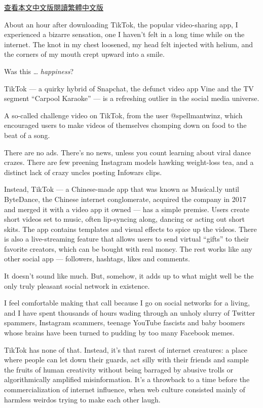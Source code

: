 \href{https://cn.nytimes.com/technology/20181204/tiktok-a-chinese-video-app-brings-fun-back-to-social-media/}{查看本文中文版}\href{https://cn.nytimes.com/technology/20181204/tiktok-a-chinese-video-app-brings-fun-back-to-social-media/zh-hant/}{閱讀繁體中文版}

About an hour after downloading TikTok, the popular video-sharing app, I
experienced a bizarre sensation, one I haven't felt in a long time while
on the internet. The knot in my chest loosened, my head felt injected
with helium, and the corners of my mouth crept upward into a smile.

Was this \ldots{} \emph{happiness}?

TikTok --- a quirky hybrid of Snapchat, the defunct video app Vine and
the TV segment ``Carpool Karaoke'' --- is a refreshing outlier in the
social media universe.

A so-called challenge video on TikTok, from the user @spellmantwinz,
which encouraged users to make videos of themselves chomping down on
food to the beat of a song.

There are no ads. There's no news, unless you count learning about viral
dance crazes. There are few preening Instagram models hawking
weight-loss tea, and a distinct lack of crazy uncles posting Infowars
clips.

Instead, TikTok --- a Chinese-made app that was known as Musical.ly
until ByteDance, the Chinese internet conglomerate, acquired the company
in 2017 and merged it with a video app it owned --- has a simple
premise. Users create short videos set to music, often lip-syncing
along, dancing or acting out short skits. The app contains templates and
visual effects to spice up the videos. There is also a live-streaming
feature that allows users to send virtual ``gifts'' to their favorite
creators, which can be bought with real money. The rest works like any
other social app --- followers, hashtags, likes and comments.

It doesn't sound like much. But, somehow, it adds up to what might well
be the only truly pleasant social network in existence.

I feel comfortable making that call because I go on social networks for
a living, and I have spent thousands of hours wading through an unholy
slurry of Twitter spammers, Instagram scammers, teenage YouTube fascists
and baby boomers whose brains have been turned to pudding by too many
Facebook memes.

TikTok has none of that. Instead, it's that rarest of internet
creatures: a place where people can let down their guards, act silly
with their friends and sample the fruits of human creativity without
being barraged by abusive trolls or algorithmically amplified
misinformation. It's a throwback to a time before the commercialization
of internet influence, when web culture consisted mainly of harmless
weirdos trying to make each other laugh.


